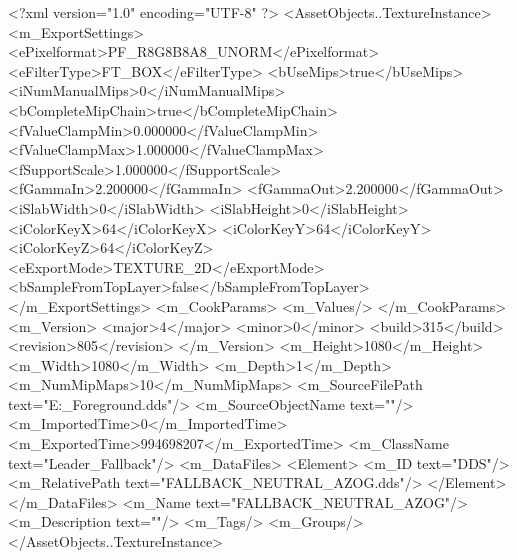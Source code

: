 <?xml version="1.0" encoding="UTF-8" ?>
<AssetObjects..TextureInstance>
	<m_ExportSettings>
		<ePixelformat>PF_R8G8B8A8_UNORM</ePixelformat>
		<eFilterType>FT_BOX</eFilterType>
		<bUseMips>true</bUseMips>
		<iNumManualMips>0</iNumManualMips>
		<bCompleteMipChain>true</bCompleteMipChain>
		<fValueClampMin>0.000000</fValueClampMin>
		<fValueClampMax>1.000000</fValueClampMax>
		<fSupportScale>1.000000</fSupportScale>
		<fGammaIn>2.200000</fGammaIn>
		<fGammaOut>2.200000</fGammaOut>
		<iSlabWidth>0</iSlabWidth>
		<iSlabHeight>0</iSlabHeight>
		<iColorKeyX>64</iColorKeyX>
		<iColorKeyY>64</iColorKeyY>
		<iColorKeyZ>64</iColorKeyZ>
		<eExportMode>TEXTURE_2D</eExportMode>
		<bSampleFromTopLayer>false</bSampleFromTopLayer>
	</m_ExportSettings>
	<m_CookParams>
		<m_Values/>
	</m_CookParams>
	<m_Version>
		<major>4</major>
		<minor>0</minor>
		<build>315</build>
		<revision>805</revision>
	</m_Version>
	<m_Height>1080</m_Height>
	<m_Width>1080</m_Width>
	<m_Depth>1</m_Depth>
	<m_NumMipMaps>10</m_NumMipMaps>
	<m_SourceFilePath text="E:\Jordi\Escritorio\ModdingIcons\LOTR\ExtensionLeaderPotraits\Azog_Foreground.dds"/>
	<m_SourceObjectName text=""/>
	<m_ImportedTime>0</m_ImportedTime>
	<m_ExportedTime>994698207</m_ExportedTime>
	<m_ClassName text="Leader_Fallback"/>
	<m_DataFiles>
		<Element>
			<m_ID text="DDS"/>
			<m_RelativePath text="FALLBACK_NEUTRAL_AZOG.dds"/>
		</Element>
	</m_DataFiles>
	<m_Name text="FALLBACK_NEUTRAL_AZOG"/>
	<m_Description text=""/>
	<m_Tags/>
	<m_Groups/>
</AssetObjects..TextureInstance>

